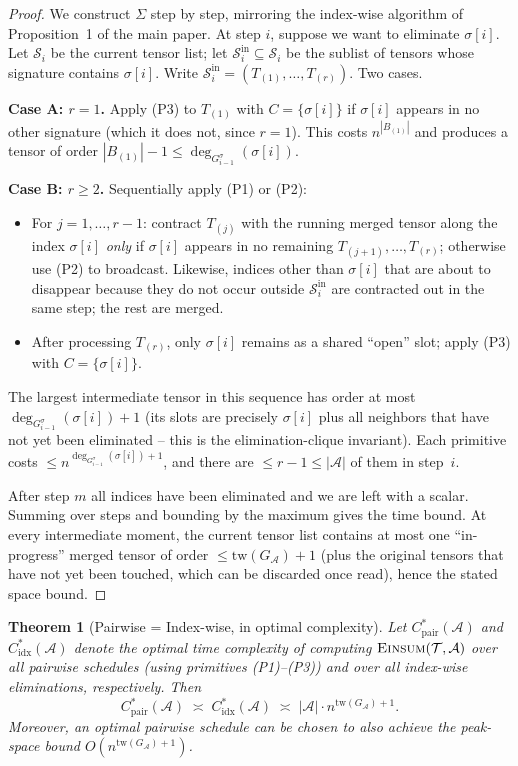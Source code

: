 \documentclass[11pt]{article}
\newcommand{\Einsum}{\textsc{Einsum}}
\newcommand{\tensorcontraction}{\Einsum}
\newcommand{\calA}{\mathcal{A}}
\newcommand{\calT}{\mathcal{T}}
\newcommand{\calS}{\mathcal{S}}
\newcommand{\tw}{\mathrm{tw}}
\newcommand{\appequal}{\asymp}
\theoremstyle{plain}
\newtheorem{theorem}{Theorem}[section]
\theoremstyle{definition}
\begin{document}
\begin{proof}
We construct $\Sigma$ step by step, mirroring the index-wise algorithm of
Proposition~1 of the main paper.  At step $i$, suppose we want to eliminate
$\sigma[i]$.  Let $\calS_i$ be the current tensor list; let
$\calS_i^{\mathrm{in}}\subseteq\calS_i$ be the sublist of tensors whose
signature contains $\sigma[i]$.  Write $\calS_i^{\mathrm{in}}=
(T_{(1)},\ldots,T_{(r)})$.  Two cases.

\textbf{Case A: $r=1$.}  Apply (P3) to $T_{(1)}$ with $C=\{\sigma[i]\}$ if
$\sigma[i]$ appears in no other signature (which it does not, since
$r=1$).  This costs $n^{|B_{(1)}|}$ and produces a tensor of order
$|B_{(1)}|-1\leq \deg_{G^\sigma_{i-1}}(\sigma[i])$.

\textbf{Case B: $r\geq 2$.}  Sequentially apply (P1) or (P2):
\begin{itemize}[leftmargin=2em]
\item For $j=1,\ldots,r-1$: contract $T_{(j)}$ with the running merged
tensor along the index $\sigma[i]$ \emph{only} if $\sigma[i]$ appears in
no remaining $T_{(j+1)},\ldots,T_{(r)}$; otherwise use (P2) to broadcast.
Likewise, indices other than $\sigma[i]$ that are about to disappear
because they do not occur outside $\calS_i^{\mathrm{in}}$ are contracted
out in the same step; the rest are merged.
\item After processing $T_{(r)}$, only $\sigma[i]$ remains as a shared
``open'' slot; apply (P3) with $C=\{\sigma[i]\}$.
\end{itemize}
The largest intermediate tensor in this sequence has order at most
$\deg_{G^\sigma_{i-1}}(\sigma[i])+1$ (its slots are precisely
$\sigma[i]$ plus all neighbors that have not yet been eliminated -- this
is the elimination-clique invariant).  Each primitive costs
$\leq n^{\deg_{G^\sigma_{i-1}}(\sigma[i])+1}$, and there are
$\leq r-1\leq |\calA|$ of them in step~$i$.

After step $m$ all indices have been eliminated and we are left with a
scalar.  Summing over steps and bounding by the maximum gives the time
bound.  At every intermediate moment, the current tensor list contains at
most one ``in-progress'' merged tensor of order $\leq \tw(G_\calA)+1$
(plus the original tensors that have not yet been touched, which can be
discarded once read), hence the stated space bound.
\end{proof}

\begin{theorem}[Pairwise = Index-wise, in optimal complexity]
\label{thm:pairwise-equals-indexwise}
Let $C^\ast_{\mathrm{pair}}(\calA)$ and $C^\ast_{\mathrm{idx}}(\calA)$ denote
the optimal time complexity of computing $\tensorcontraction(\calT,\calA)$
over all pairwise schedules (using primitives (P1)--(P3)) and over all
index-wise eliminations, respectively.  Then
\[
   C^\ast_{\mathrm{pair}}(\calA) \;\appequal\; C^\ast_{\mathrm{idx}}(\calA)
   \;\appequal\; |\calA|\cdot n^{\tw(G_\calA)+1}.
\]
Moreover, an optimal pairwise schedule can be chosen to also achieve the
peak-space bound $O(n^{\tw(G_\calA)+1})$.
\end{theorem}
\end{document}
